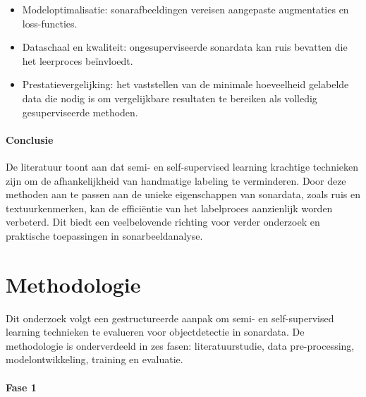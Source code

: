 \begin{itemize}
    \item Modeloptimalisatie: sonarafbeeldingen vereisen aangepaste augmentaties en loss-functies.
    \item Dataschaal en kwaliteit: ongesuperviseerde sonardata kan ruis bevatten die het leerproces beïnvloedt.
    \item Prestatievergelijking: het vaststellen van de minimale hoeveelheid gelabelde data die nodig is om vergelijkbare resultaten te bereiken als volledig gesuperviseerde methoden.
\end{itemize}

\paragraph{Conclusie}

De literatuur toont aan dat semi- en self-supervised learning krachtige technieken zijn om de afhankelijkheid van handmatige labeling te verminderen. Door deze methoden aan te passen aan de unieke eigenschappen van sonardata, zoals ruis en textuurkenmerken, kan de efficiëntie van het labelproces aanzienlijk worden verbeterd. Dit biedt een veelbelovende richting voor verder onderzoek en praktische toepassingen in sonarbeeldanalyse.


\section{Methodologie}%
\label{sec:methodologie}

Dit onderzoek volgt een gestructureerde aanpak om semi- en self-supervised learning technieken te evalueren voor objectdetectie in sonardata. De methodologie is onderverdeeld in zes fasen: literatuurstudie, data pre-processing, modelontwikkeling, training en evaluatie.

\paragraph{Fase 1}

